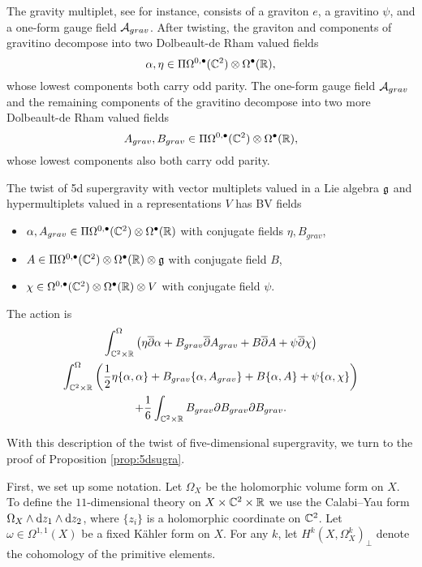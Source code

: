 The gravity multiplet, see \cite{CCDF} for instance, consists of a graviton $e$, a gravitino $\psi$, and a one-form gauge field $\mathcal A_{grav}$.
After twisting, the graviton and components of gravitino decompose into two Dolbeault-de Rham valued fields 
\[
\alpha, \eta \in \Pi \Omega^{0,\bullet}(\mathbb C^2) \otimes \Omega^\bullet(\mathbb R) ,
\]
whose lowest components both carry odd parity. 
The one-form gauge field $\mathcal A_{grav}$ and the remaining components of the gravitino decompose into two more Dolbeault-de Rham valued fields
\[
A_{grav} , B_{grav} \in \Pi \Omega^{0,\bullet}(\mathbb C^2) \otimes \Omega^\bullet(\mathbb R) ,
\]
whose lowest components also both carry odd parity. 

\begin{conj}
\label{conj:5dsugra}
The twist of 5d supergravity with vector multiplets valued in a Lie algebra $\mathfrak g$ and hypermultiplets valued in a representations $V$ has BV fields
\begin{itemize}
\item $\alpha, A_{grav} \in \Pi \Omega^{0,\bullet}(\mathbb C^2) \otimes \Omega^\bullet(\mathbb R)$ with conjugate fields $\eta, B_{grav}$,
\item $A \in \Pi \Omega^{0,\bullet}(\mathbb C^2) \otimes \Omega^\bullet(\mathbb R) \otimes \mathfrak g$ with conjugate field $B$,
\item $\chi \in \Omega^{0,\bullet}(\mathbb C^2) \otimes \Omega^\bullet(\mathbb R) \otimes V$ with conjugate field $\psi$.
\end{itemize}

The action is
\begin{multline}
\label{eqn:5daction} 
\int^\Omega_{\mathbb C^2 \times \mathbb R} \left(\eta \overline{\partial} \alpha + B_{grav} \overline{\partial} A_{grav} + B \overline{\partial} A + \psi \overline{\partial} \chi \right) \\
  \int^\Omega_{\mathbb C^2 \times \mathbb R} \left( \frac12\eta \{\alpha, \alpha\} +  B_{grav} \{\alpha, A_{grav}\}+ B \{\alpha, A\} +  \psi \{\alpha, \chi \}\right) \\ 
+ \frac16 \int_{\mathbb C^2 \times \mathbb R} B_{grav} \partial B_{grav} \partial B_{grav} .
\end{multline}
\end{conj}


\parsec[-]

With this description of the twist of five-dimensional supergravity, we turn to the proof of Proposition \ref{prop:5dsugra}. 

First, we set up some notation. 
Let $\Omega_X$ be the holomorphic volume form on $X$. 
To define the $11$-dimensional theory on $X \times \mathbb C^2 \times \mathbb R$ we use the Calabi--Yau form $\Omega_X \wedge {\rm d} z_1 \wedge {\rm d} z_2$, where $\{z_i\}$ is a holomorphic coordinate on $\mathbb C^2$. 
Let $\omega \in \Omega^{1,1}(X)$ be a fixed K\"ahler form on $X$.
For any $k$, let $H^k(X, \Omega^k_X)_\perp$ denote the cohomology of the primitive elements. 


